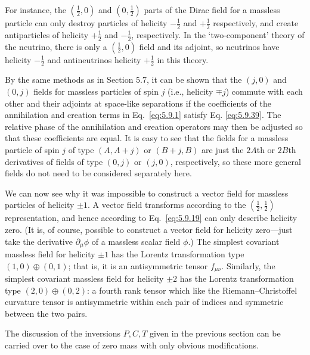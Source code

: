 For instance, the $(\tfrac12,0)$ and $(0,\tfrac12)$ parts of the Dirac field
for a massless particle can only destroy particles of helicity $-\tfrac12$ and
$+\tfrac12$ respectively, and create antiparticles of helicity $+\tfrac12$ and
$-\tfrac12$, respectively. In the `two-component' theory of the neutrino,
there is only a $(\tfrac12,0)$ field and its adjoint, so neutrinos have helicity
$-\tfrac12$ and antineutrinos helicity $+\tfrac12$ in this theory.

By the same methods as in Section 5.7, it can be shown that the $(j,0)$ and
$(0,j)$ fields for massless particles of spin $j$ (i.e., helicity $\mp j$)
commute with each other and their adjoints at space-like separations if the
coefficients of the annihilation and creation terms in Eq.~\eqref{eq:5.9.1} satisfy Eq.
\eqref{eq:5.9.39}. The relative phase of the annihilation and creation operators may
then be adjusted so that these coefficients are equal. It is easy to see that
the fields for a massless particle of spin $j$ of type $(A,A+j)$ or $(B+j,B)$
are just the $2A$th or $2B$th derivatives of fields of type $(0,j)$ or $(j,0)$,
respectively, so these more general fields do not need to be considered
separately here.

We can now see why it was impossible to construct a vector field for massless
particles of helicity $\pm1$. A vector field transforms according to the
$(\tfrac12,\tfrac12)$ representation, and hence according to Eq.~\eqref{eq:5.9.19} can
only describe helicity zero. (It is, of course, possible to construct a vector
field for helicity zero---just take the derivative $\partial_\mu\phi$ of a
massless scalar field $\phi$.) The simplest covariant massless field for
helicity $\pm1$ has the Lorentz transformation type $(1,0)\oplus(0,1)$; that
is, it is an antisymmetric tensor $f_{\mu\nu}$. Similarly, the simplest
covariant massless field for helicity $\pm2$ has the Lorentz transformation
type $(2,0)\oplus(0,2)$: a fourth rank tensor which like the
Riemann--Christoffel curvature tensor is antisymmetric within each pair of
indices and symmetric between the two pairs.

The discussion of the inversions $P,C,T$ given in the previous section can be
carried over to the case of zero mass with only obvious modifications.
